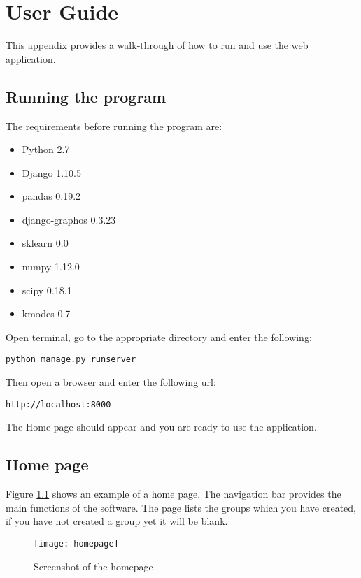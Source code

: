 \chapter{User Guide}

This appendix provides a walk-through of how to run and use the web application.

\section{Running the program}

The requirements before running the program are:

\begin{itemize}
	\item Python 2.7
	\item Django 1.10.5
	\item pandas 0.19.2
	\item django-graphos 0.3.23
	\item sklearn 0.0
	\item numpy 1.12.0
	\item scipy 0.18.1
	\item kmodes 0.7
\end{itemize}

Open terminal, go to the appropriate directory and enter the following:

\begin{lstlisting}
python manage.py runserver
\end{lstlisting}

Then open a browser and enter the following url:\par

\begin{lstlisting}
http://localhost:8000
\end{lstlisting}

The Home page should appear and you are ready to use the application.

\section{Home page}

Figure \ref{fig:homepage} shows an example of a home page. The navigation bar provides the main functions of the software. The page lists the groups which you have created, if you have not created a group yet it will be blank.

\begin{figure}[h]
\centering
\texttt{[image: homepage]}
\caption{Screenshot of the homepage}
\label{fig:homepage}
\end{figure}

